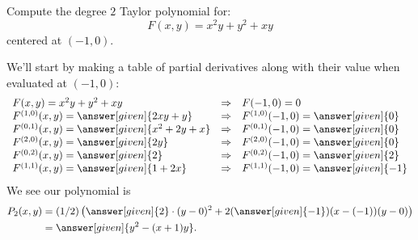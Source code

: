 \documentclass{ximera}
\begin{document}
\begin{example}
  Compute the degree $2$ Taylor polynomial for:
  \[
  F(x,y)= x^2 y + y^2 + x y
  \]
  centered at $(-1,0)$.
  \begin{explanation}
    We'll start by making a table of partial derivatives along with
    their value when evaluated at $(-1,0)$:
    \[
    \begin{array}{lcl}
      F(x,y) = x^2y+y^2+xy & \Rightarrow &F(-1,0) = 0\\
      F^{(1,0)}(x,y) = \answer[given]{2xy+y} & \Rightarrow & F^{(1,0)}(-1,0) = \answer[given]{0}\\
      F^{(0,1)}(x,y) = \answer[given]{x^2+2y+x} &\Rightarrow  & F^{(0,1)}(-1,0) = \answer[given]{0}\\
      F^{(2,0)}(x,y) = \answer[given]{2y} &\Rightarrow & F^{(2,0)}(-1,0) = \answer[given]{0}\\
      F^{(0,2)}(x,y) = \answer[given]{2} &\Rightarrow & F^{(0,2)}(-1,0) = \answer[given]{2}\\
      F^{(1,1)}(x,y) = \answer[given]{1+2x} &\Rightarrow & F^{(1,1)}(-1,0) = \answer[given]{-1}
    \end{array}
    \]
    We see our polynomial is
    \begin{align*}
      P_2(x,y) &= (1/2)\left(\answer[given]{2}\cdot (y-0)^2 + 2 (\answer[given]{-1})(x-(-1))(y-0) \right)\\
      &= \answer[given]{y^2-(x+1)y}.
    \end{align*}
  \end{explanation}
\end{example}
\end{document}
